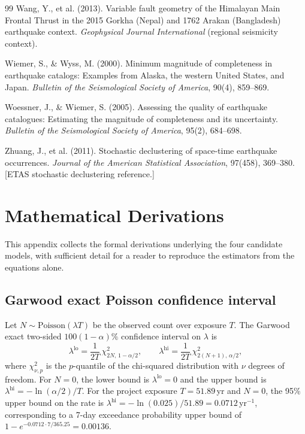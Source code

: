 \documentclass[10pt,a4paper,twocolumn]{article}
\begin{document}
\begin{thebibliography}{99}
 Wang, Y., et al. (2013). Variable fault geometry of the Himalayan Main Frontal Thrust in the 2015 Gorkha (Nepal) and 1762 Arakan (Bangladesh) earthquake context. \emph{Geophysical Journal International} (regional seismicity context).

 Wiemer, S., \& Wyss, M. (2000). Minimum magnitude of completeness in earthquake catalogs: Examples from Alaska, the western United States, and Japan. \emph{Bulletin of the Seismological Society of America}, 90(4), 859--869.

 Woessner, J., \& Wiemer, S. (2005). Assessing the quality of earthquake catalogues: Estimating the magnitude of completeness and its uncertainty. \emph{Bulletin of the Seismological Society of America}, 95(2), 684--698.

 Zhuang, J., et al. (2011). Stochastic declustering of space-time earthquake occurrences. \emph{Journal of the American Statistical Association}, 97(458), 369--380. [ETAS stochastic declustering reference.]

\end{thebibliography}

\appendix
\section{Mathematical Derivations}\label{app:derivations}

This appendix collects the formal derivations underlying the four candidate models, with sufficient detail for a reader to reproduce the estimators from the equations alone.

\subsection{Garwood exact Poisson confidence interval}\label{app:garwood}

Let $N\sim\text{Poisson}(\lambda T)$ be the observed count over exposure $T$. The Garwood \cite{garwood1936} exact two-sided $100(1-\alpha)\%$ confidence interval on $\lambda$ is
\begin{equation}\label{eq:garwood-chi2}
\lambda^{\text{lo}} = \frac{1}{2T}\, \chi^2_{2N,\,1-\alpha/2}, \qquad \lambda^{\text{hi}} = \frac{1}{2T}\, \chi^2_{2(N+1),\,\alpha/2},
\end{equation}
where $\chi^2_{\nu,p}$ is the $p$-quantile of the chi-squared distribution with $\nu$ degrees of freedom. For $N=0$, the lower bound is $\lambda^{\text{lo}}=0$ and the upper bound is $\lambda^{\text{hi}} = -\ln(\alpha/2)/T$. For the project exposure $T=51.89$\,yr and $N=0$, the 95\% upper bound on the rate is $\lambda^{\text{hi}} = -\ln(0.025)/51.89 = 0.0712$\,yr$^{-1}$, corresponding to a 7-day exceedance probability upper bound of $1 - e^{-0.0712 \cdot 7/365.25} = 0.00136$.
\end{document}

